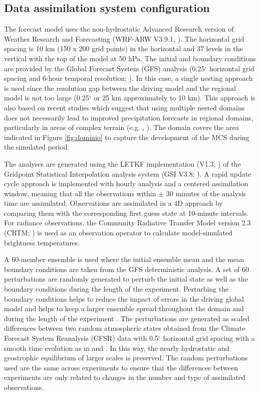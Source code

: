 \documentclass[preprint, 3p, authoryear,review, 12pt]{elsarticle} %
\begin{document}
\hypertarget{config}{%
\subsection{Data assimilation system configuration}\label{config}}

The forecast model uses the non-hydrostatic Advanced Research version of Weather Research and Forecasting (WRF-ARW V3.9.1, \citet{skamarock2008}).
The horizontal grid spacing is 10 km (150 x 200 grid points) in the horizontal and 37 levels in the vertical with the top of the model at 50 hPa.
The initial and boundary conditions are provided by the Global Forecast System (GFS) analysis (0.25\(^{\circ}\) horizontal grid spacing and 6-hour temporal resolution; \citet{cisl_rda_ds084.1}). In this case, a single nesting approach is used since the resolution gap between the driving model and the regional model is not too large (0.25\(^{\circ}\) or 25 km approximately to 10 km). This approach is also based on recent studies which suggest that using multiple nested domains does not necessarily lead to improved precipitation forecasts in regional domains, particularly in areas of complex terrain (e.g. \citet{liang2019}, \citet{beck2004}). The domain covers the area indicated in Figure \ref{fig:dominio} to capture the development of the MCS during the simulated period.

The analyses are generated using the LETKF implementation (V1.3, \citet{hunt2007}) of the Gridpoint Statistical Interpolation analysis system (GSI V3.8; \citet{shao2016}).
A rapid update cycle approach is implemented with hourly analysis and a centered assimilation window, meaning that all the observations within \(\pm\) 30 minutes of the analysis time are assimilated.
Observations are assimilated in a 4D approach by comparing them with the corresponding first guess state at 10-minute intervals.
For radiance observations, the Community Radiative Transfer Model version 2.3 (CRTM; \citet{han2006}) is used as an observation operator to calculate model-simulated brightness temperatures.

A 60-member ensemble is used where the initial ensemble mean and the mean boundary conditions are taken from the GFS deterministic analysis. A set of 60 perturbations are randomly generated to perturb the initial state as well as the boundary conditions during the length of the experiment. Perturbing the boundary conditions helps to reduce the impact of errors in the driving global model and helps to keep a larger ensemble spread throughout the domain and during the length of the experiment \citep{ouaraini2015}. The perturbations are generated as scaled differences between two random atmospheric states obtained from the Climate Forecast System Reanalysis (CFSR) data with 0.5\(^{\circ}\) horizontal grid spacing with a smooth time evolution as in \citet{necker2020} and \citet{maldonado2021}. In this way, the nearly hydrostatic and geostrophic equilibrium of larger scales is preserved. The random perturbations used are the same across experiments to ensure that the differences between experiments are only related to changes in the number and type of assimilated observations.
\end{document}
